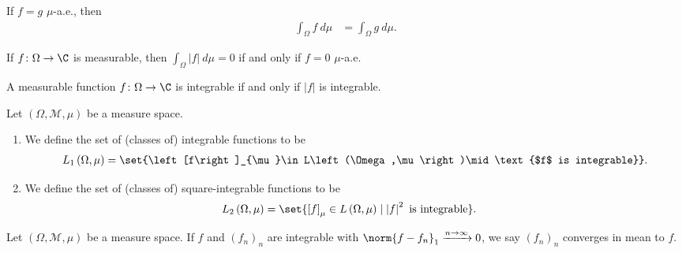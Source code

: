 \begin{fact}
  If $f = g$ $\mu$-a.e., then
  \begin{align*}
    \int_{\Omega}^{} f\:d\mu &= \int_{\Omega}^{} g\:d\mu.
  \end{align*}
\end{fact}
\begin{fact}
  If $f\colon \Omega\rightarrow \C$ is measurable, then $\int_{\Omega}^{} \left\vert f \right\vert\:d\mu = 0$ if and only if $f = 0$ $\mu$-a.e.
\end{fact}
\begin{fact}
  A measurable function $f\colon \Omega\rightarrow \C$ is integrable if and only if $\left\vert f \right\vert$ is integrable.
\end{fact}
\begin{definition}
  Let $\left(\Omega,\mathcal{M},\mu\right)$ be a measure space.
  \begin{enumerate}[(1)]
    \item We define the set of (classes of) integrable functions to be
      \begin{align*}
        L_{1}\left(\Omega,\mu\right) = \set{\left[f\right]_{\mu}\in L\left(\Omega,\mu\right)\mid \text{$f$ is integrable}}.
      \end{align*}
    \item We define the set of (classes of) square-integrable functions to be
      \begin{align*}
        L_{2}\left(\Omega,\mu\right) &= \set{\left[f\right]_{\mu}\in L\left(\Omega,\mu\right)\mid \left\vert f \right\vert^2\text{ is integrable}}.
      \end{align*}
  \end{enumerate}
\end{definition}
\begin{definition}
  Let $\left(\Omega,\mathcal{M},\mu\right)$ be a measure space. If $f$ and $\left(f_n\right)_n$ are integrable with $\norm{f-f_n}_{1}\xrightarrow{n\rightarrow\infty}0$, we say $\left(f_n\right)_n$ converges in mean to $f$.
\end{definition}

